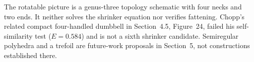 \begin{example}
The rotatable picture is a genus-three topology schematic with four
necks and two ends. It neither solves the shrinker equation nor verifies
fattening. Chopp's related compact four-handled dumbbell in Section~4.5,
Figure~24, failed his self-similarity test ($E=0.584$) and is not a sixth
shrinker candidate. Semiregular polyhedra and a trefoil are future-work
proposals in Section~5, not constructions established there.
\end{example}
